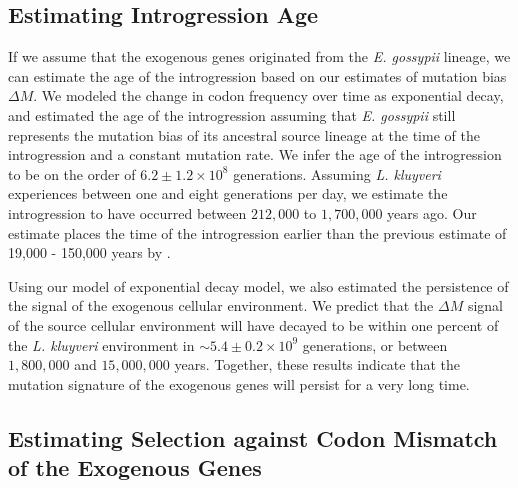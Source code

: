 \documentclass[doublespacing,linenumbers]{bmcart-modified}
\newcommand{\kluyveri}{\textit{L. kluyveri}\xspace}
\newcommand{\gossypii}{\textit{E. gossypii}\xspace}
\newcommand{\DM}{\ensuremath{{\Delta M}}\xspace}
\begin{document}
\subsection*{Estimating Introgression Age}

If we assume that the exogenous genes originated from the \gossypii lineage, we can estimate the age of the introgression based on our estimates of mutation bias \DM.
We modeled the change in codon frequency over time as exponential decay, and estimated the age of the introgression assuming that \gossypii still represents the mutation bias of its ancestral source lineage at the time of the introgression and a constant mutation rate.
We infer the age of the introgression to be on the order of $6.2\pm1.2\times 10^8$ generations. 
Assuming \kluyveri experiences between one and eight generations per day, we estimate the introgression to have occurred between $212,000$ to $1,700,000$ years ago.
Our estimate places the time of the introgression earlier than the previous estimate of 19,000 - 150,000 years by \cite{friedrich2015}.

Using our model of exponential decay model, we also estimated the persistence of the signal of the exogenous cellular environment.
We predict that the \DM signal of the source cellular environment will have decayed to be within one percent of the \kluyveri environment in $\sim 5.4\pm0.2\times 10^9 $ generations, or between $1,800,000$ and $15,000,000$ years.
Together, these results indicate that the mutation signature of the exogenous genes will persist for a very long time.

\subsection*{Estimating Selection against Codon Mismatch of the Exogenous Genes}
\end{document}
